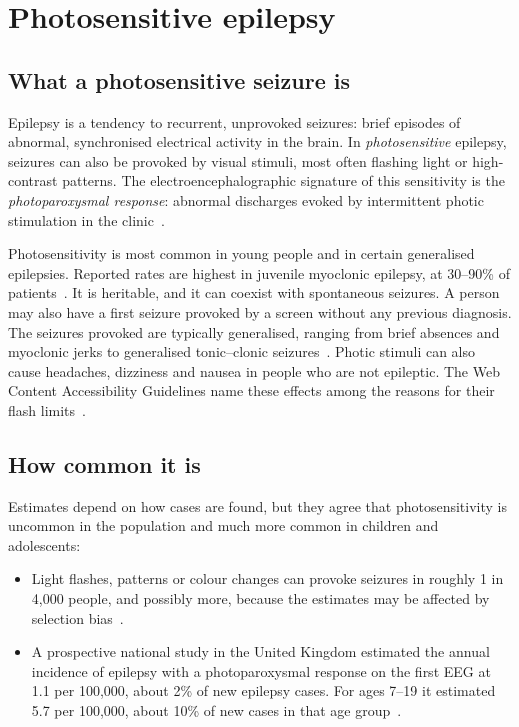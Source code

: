 \documentclass[11pt,a4paper]{article}
\begin{document}
\section{Photosensitive epilepsy}
\label{sec:pse}

\subsection{What a photosensitive seizure is}

Epilepsy is a tendency to recurrent, unprovoked seizures: brief episodes of abnormal, synchronised electrical activity in the brain. In \emph{photosensitive} epilepsy, seizures can also be provoked by visual stimuli, most often flashing light or high-contrast patterns. The electroencephalographic signature of this sensitivity is the \emph{photoparoxysmal response}: abnormal discharges evoked by intermittent photic stimulation in the clinic~\cite{harding1994,fisher2005review}.

Photosensitivity is most common in young people and in certain generalised epilepsies. Reported rates are highest in juvenile myoclonic epilepsy, at 30--90\% of patients~\cite{fisher2022}. It is heritable, and it can coexist with spontaneous seizures. A person may also have a first seizure provoked by a screen without any previous diagnosis. The seizures provoked are typically generalised, ranging from brief absences and myoclonic jerks to generalised tonic--clonic seizures~\cite{fisher2005review}. Photic stimuli can also cause headaches, dizziness and nausea in people who are not epileptic. The Web Content Accessibility Guidelines name these effects among the reasons for their flash limits~\cite{wcag22}.

\subsection{How common it is}

Estimates depend on how cases are found, but they agree that photosensitivity is uncommon in the population and much more common in children and adolescents:

\begin{itemize}
  \item Light flashes, patterns or colour changes can provoke seizures in roughly 1 in 4{,}000 people, and possibly more, because the estimates may be affected by selection bias~\cite{fisher2022}.
  \item A prospective national study in the United Kingdom estimated the annual incidence of epilepsy with a photoparoxysmal response on the first EEG at 1.1 per 100{,}000, about 2\% of new epilepsy cases. For ages 7--19 it estimated 5.7 per 100{,}000, about 10\% of new cases in that age group~\cite{quirk1995}.
\end{itemize}
\end{document}
